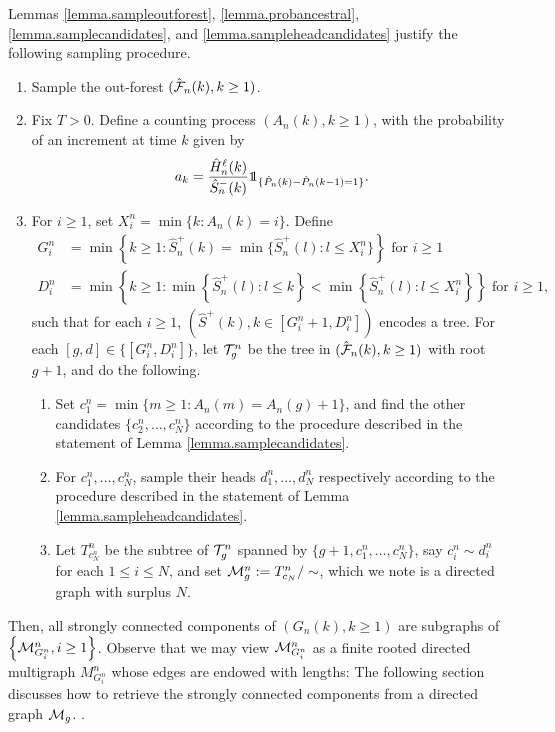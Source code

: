 Lemmas \ref{lemma.sampleoutforest}, \ref{lemma.probancestral}, \ref{lemma.samplecandidates}, and \ref{lemma.sampleheadcandidates} justify the following sampling procedure.
\begin{enumerate}
    \item Sample the out-forest $(\hat{{\mathcal F}}_n(k),k\geq 1)$.
    \item Fix $T>0$. Define a counting process $(A_n(k),k\geq 1)$, with the probability of an increment at time $k$ given by $$a_k=\frac{\hat{H}_n^\ell(k)}{\hat{S}_n^-(k)}\one_{\{\hat{P}_n(k)-\hat{P}_n(k-1)=1\}}.$$
    \item For $i\geq 1$, set $X_i^n=\min\{k:A_n(k)=i\}$. Define
\begin{align*}G_i^n&=\min\left\{k\geq 1:\hat{S}^{+}_n(k)=\min\{\hat{S}^{+}_n(l):l\leq X_i^n\}\right\}\text{ for }i\geq 1\\
D_i^n&=\min\left\{k \geq 1: \min\left\{\hat{S}^{+}_n(l):l\leq k\right\} < \min\left\{\hat{S}^{+}_n(l):l\leq X_i^n\right\}\right\}\text{ for }i\geq 1,
\end{align*}
such that for each $i\geq 1$, $\left(\hat{S}^+(k),k\in [G_i^n+1,D_i^n]\right)$ encodes a tree. For each $[g,d]\in \{[G_i^n,D_i^n]\}$, let ${\mathcal T}^n_g$ be the tree in $(\hat{{\mathcal F}}_n(k),k\geq 1)$ with root $g+1$, and do the following.
    \begin{enumerate}
    \item \label{item.procedure3} Set $c_1^n=\min\{m\geq 1:A_n(m)=A_n(g)+1\}$, and find the other candidates $\{c_2^n,\dots ,c_{N}^n\}$ according to the procedure described in the statement of Lemma \ref{lemma.samplecandidates}.
    \item \label{item.procedure4} For $c_1^n,\dots, c_{N}^n$, sample their heads $d_1^n,\dots ,d_N^n$ respectively according to the procedure described in the statement of Lemma \ref{lemma.sampleheadcandidates}.
    \item Let $T^n_{c^n_N}$ be the subtree of ${\mathcal T}^n_g$ spanned by $\{g+1,c_1^n,\dots ,c_N^n\}$, say $c_i^n\sim d_i^n$ for each $1\leq i\leq N$, and set ${\mathcal M}^n_g:=T^n_{c_N}/\sim$, which we note is a directed graph with surplus $N$. 
\end{enumerate}
\end{enumerate}
Then, all strongly connected components of $(G_n(k),k\geq 1)$ are subgraphs of $\left\{{\mathcal M}^n_{G_i^n}, i\geq 1 \right\}$. Observe that we may view ${\mathcal M}^n_{G_i^n}$ as a finite rooted directed multigraph $M^n_{G_i^n}$ whose edges are endowed with lengths:  The following section discusses how to retrieve the strongly connected components from a directed graph ${\mathcal M}_g$.
. 




